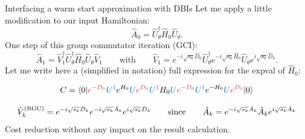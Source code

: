 \documentclass[aspectratio=169, 8pt, xcolor={svgnames}]{beamer}
\begin{document}
\begin{frame}{Interfacing a warm start approximation with DBIs}
Let me apply a little modification to our input Hamiltonian:
$$ \hat{A}_0 = \hat{U}_{\theta}^{\dagger} \hat{H}_0 \hat{U}_{\theta}. $$
One step of this group commutator iteration (GCI):
$$ \hat{A}_1 = \hat{V}_1^{\dagger} \hat{U}_{\theta}^{\dagger} \hat{H}_0 \hat{U}_{\theta} \hat{V}_1
\qquad \text{with} \qquad \hat{V}_1 =  e^{- i \sqrt{s_0}\hat{D}_0} \hat{U}_{\theta}^{\dagger} 
e^{- i \sqrt{s_0} \hat{H}_0}   \hat{U}_{\theta}  e^{i \sqrt{s_0}\hat{D}_0}. 
$$
Let me write here a (simplified in notation) full expression for the expval of $\hat{H}_0$:

$$ C = \braket{0| \textcolor{persianred}{e^{-D_0}} \textcolor{mediumpersianblue}{U^{\dagger}} 
e^{H_0} \textcolor{mediumpersianblue}{U}  \textcolor{persianred}{e^{D_0}} \textcolor{mediumpersianblue}{U^{\dagger}} 
H_0 \textcolor{mediumpersianblue}{U}  \textcolor{persianred}{e^{-D_0}} \textcolor{mediumpersianblue}{U^{\dagger}} e^{-H_0}  
\textcolor{mediumpersianblue}{U}  \textcolor{persianred}{e^{D_0}} |0} $$

\begin{tcolorbox}[colback=red!15, title=Reduced group commutator formula]
$$ \hat{V}^{(\rm RGC)}_k = e^{- i \sqrt{s_k}\hat{D}_k} e^{-i \sqrt{s_k}\hat{A}_k} e^{i \sqrt{s_k}\hat{D}_k} \qquad 
\text{since} \qquad \hat{A}_k =  e^{- i \sqrt{s_k}\hat{A}_k } \hat{A}_k e^{i \sqrt{s_k}\hat{A}_k }  $$ 
Cost reduction without any impact on the result calculation.
\end{tcolorbox}
\end{frame}
\end{document}
